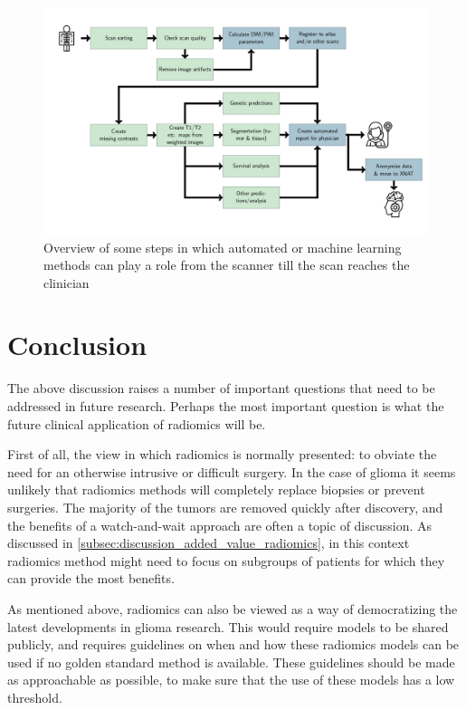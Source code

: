 \begin{figure}[htbp]
\includegraphics[width=\textwidth]{Figures/Pipeline.png}
\caption{Overview of some steps in which automated or machine learning methods can play a role from the scanner till the scan reaches the clinician}\label{fig:discussion_pipeline_automatic}
\end{figure}



\section{Conclusion}\label{sec:discussion_conclusion}


The above discussion raises a number of important questions that need to be addressed in future research.
Perhaps the most important question is what the future clinical application of radiomics will be.


First of all, the view in which radiomics is normally presented: to obviate the need for an otherwise intrusive or difficult surgery.
In the case of glioma it seems unlikely that radiomics methods will completely replace biopsies or prevent surgeries.
The majority of the \glspl{tumor} are removed quickly after discovery, and the benefits of a watch-and-wait approach are often a topic of discussion.
As discussed in \cref{subsec:discussion_added_value_radiomics}, in this context radiomics method might need to focus on subgroups of patients for which they can provide the most benefits.

As mentioned above, radiomics can also be viewed as a way of democratizing the latest  developments in glioma research.
This would require models to be shared publicly, and requires guidelines on when and how these radiomics models can be used if no golden standard method is available.
These guidelines should be made as approachable as possible, to make sure that the use of these models has a low threshold.

